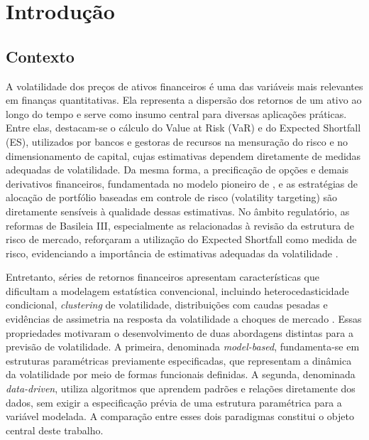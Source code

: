 \chapter{Introdução}

\section{Contexto}

A volatilidade dos preços de ativos financeiros é uma das variáveis mais relevantes em
finanças quantitativas. Ela representa a dispersão dos retornos de um ativo ao longo do tempo e serve como insumo central para diversas aplicações práticas. Entre elas, destacam-se o cálculo do Value at Risk (VaR) e do Expected Shortfall (ES), utilizados por bancos e gestoras de recursos na mensuração do risco e no dimensionamento de capital, cujas estimativas dependem diretamente de medidas adequadas de volatilidade.
Da mesma forma, a precificação de opções e demais derivativos financeiros, 
fundamentada no modelo pioneiro de \textcite{black1973pricing}, e as estratégias de alocação de portfólio 
baseadas em controle de risco (volatility targeting) são diretamente sensíveis à qualidade dessas 
estimativas. No âmbito regulatório, as reformas de Basileia III, especialmente as relacionadas à revisão 
da estrutura de risco de mercado, reforçaram a utilização do Expected Shortfall como medida de risco, evidenciando 
a importância de estimativas adequadas da volatilidade \cite{bcbs2019minimum}.

Entretanto, séries de retornos financeiros apresentam características que dificultam a modelagem
estatística convencional, incluindo heterocedasticidade condicional, \textit{clustering} de volatilidade, distribuições com caudas pesadas
e evidências de assimetria na resposta da volatilidade a choques de mercado \cite{fama1965behavior,akgiray1989conditional}. Essas propriedades motivaram 
o desenvolvimento de duas abordagens distintas para a previsão de volatilidade. A primeira, denominada \textit{model-based}, fundamenta-se em estruturas 
paramétricas previamente especificadas, que representam a dinâmica da volatilidade por meio de formas funcionais definidas. A segunda, denominada \textit{data-driven}, utiliza algoritmos que aprendem padrões e relações diretamente dos dados, sem exigir a especificação prévia de uma estrutura paramétrica para a variável modelada. A comparação entre esses dois paradigmas constitui o 
objeto central deste trabalho.

